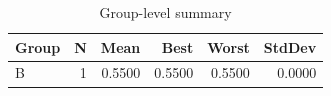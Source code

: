 \begin{table}[htbp]
\centering
\caption{Group-level summary}
\label{tab:group-summary}
\begin{tabular}{lrrrrr}
\toprule
\textbf{Group} & \textbf{N} & \textbf{Mean} & \textbf{Best} & \textbf{Worst} & \textbf{StdDev} \\
\midrule
B & 1 & 0.5500 & 0.5500 & 0.5500 & 0.0000 \\
\bottomrule
\end{tabular}
\end{table}
